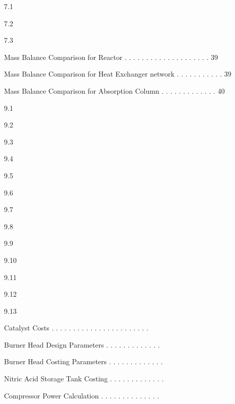 \documentclass[a4paper,portrait,12pt]{article}
\begin{document}
7.1


7.2


7.3





\begin{flushleft}
Mass Balance Comparison for Reactor . . . . . . . . . . . . . . . . . . . . 39
\end{flushleft}


\begin{flushleft}
Mass Balance Comparison for Heat Exchanger network . . . . . . . . . . . 39
\end{flushleft}


\begin{flushleft}
Mass Balance Comparison for Absorption Column . . . . . . . . . . . . . 40
\end{flushleft}





9.1


9.2


9.3


9.4


9.5


9.6


9.7


9.8


9.9


9.10


9.11


9.12


9.13





\begin{flushleft}
Catalyst Costs . . . . . . . . . . . . . . . . . . . . . . .
\end{flushleft}


\begin{flushleft}
Burner Head Design Parameters . . . . . . . . . . . . .
\end{flushleft}


\begin{flushleft}
Burner Head Costing Parameters . . . . . . . . . . . . .
\end{flushleft}


\begin{flushleft}
Nitric Acid Storage Tank Costing . . . . . . . . . . . . .
\end{flushleft}


\begin{flushleft}
Compressor Power Calculation . . . . . . . . . . . . . .
\end{flushleft}
\end{document}
